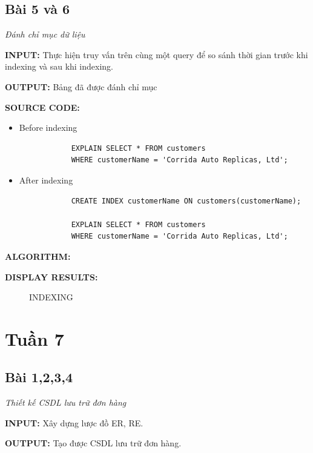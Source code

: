 \documentclass[12pt,a4paper]{report}
\begin{document}
\subsection{Bài 5 và 6}
	\begin{center}
		{\it Đánh chỉ mục dữ liệu}
	\end{center}
	
	{\bf INPUT:} Thực hiện truy vấn trên cùng một query để so sánh thời gian trước khi indexing và sau khi indexing.
	
	{\bf OUTPUT:} Bảng đã được đánh chỉ mục
	
	
	{\bf SOURCE CODE:}
	\begin{itemize}
		\item Before indexing
		\begin{lstlisting}
			EXPLAIN SELECT * FROM customers
			WHERE customerName = 'Corrida Auto Replicas, Ltd';
		\end{lstlisting}
		\item After indexing
		\begin{lstlisting}
			CREATE INDEX customerName ON customers(customerName);

			EXPLAIN SELECT * FROM customers
			WHERE customerName = 'Corrida Auto Replicas, Ltd';
		\end{lstlisting}
	\end{itemize}
	
	{\bf ALGORITHM:}
	
	
	{\bf DISPLAY RESULTS:}
		\begin{figure}[h]
		\hfill
		\hfill
		\caption{INDEXING}
		\end{figure}
\newpage
\section{Tuần 7}
\subsection{Bài 1,2,3,4}
	\begin{center}
		{\it Thiết kế CSDL lưu trữ đơn hàng}
	\end{center}
	
	{\bf INPUT:} Xây dựng lược đồ ER, RE.
	
	{\bf OUTPUT:} Tạo được CSDL lưu trữ đơn hàng.
	
\end{document}

